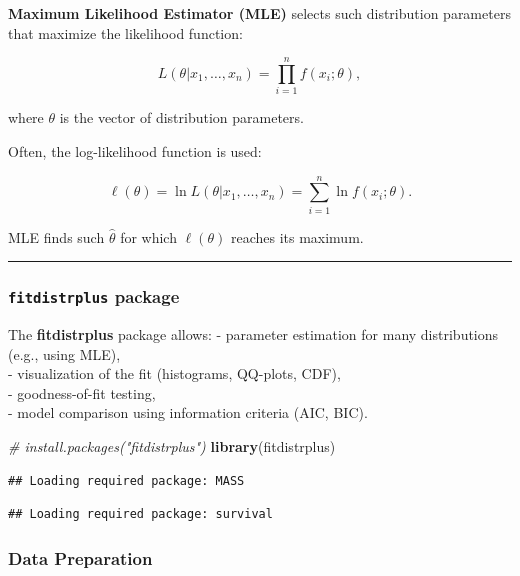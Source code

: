 \documentclass[
]{article}
\newenvironment{Shaded}{\begin{snugshade}}{\end{snugshade}}
\newcommand{\CommentTok}[1]{\textcolor[rgb]{0.56,0.35,0.01}{\textit{#1}}}
\newcommand{\FunctionTok}[1]{\textcolor[rgb]{0.13,0.29,0.53}{\textbf{#1}}}
\newcommand{\NormalTok}[1]{#1}
\begin{document}
\textbf{Maximum Likelihood Estimator (MLE)} selects such distribution
parameters that maximize the likelihood function:

\[
L(\theta | x_1, \dots, x_n) = \prod_{i=1}^n f(x_i; \theta),
\]

where \(\theta\) is the vector of distribution parameters.

Often, the log-likelihood function is used:

\[
\ell(\theta) = \ln L(\theta | x_1, \dots, x_n) = \sum_{i=1}^n \ln f(x_i; \theta).
\]

MLE finds such \(\hat{\theta}\) for which \(\ell(\theta)\) reaches its
maximum.

\begin{center}\rule{0.5\linewidth}{0.5pt}\end{center}

\subsubsection{\texorpdfstring{\texttt{fitdistrplus}
package}{fitdistrplus package}}\label{fitdistrplus-package}

The \textbf{fitdistrplus} package allows: - parameter estimation for
many distributions (e.g., using MLE),\\
- visualization of the fit (histograms, QQ-plots, CDF),\\
- goodness-of-fit testing,\\
- model comparison using information criteria (AIC, BIC).

\begin{Shaded}
\begin{Highlighting}[]
\CommentTok{\# install.packages("fitdistrplus")}
\FunctionTok{library}\NormalTok{(fitdistrplus)}
\end{Highlighting}
\end{Shaded}

\begin{verbatim}
## Loading required package: MASS
\end{verbatim}

\begin{verbatim}
## Loading required package: survival
\end{verbatim}

\subsubsection{Data Preparation}\label{data-preparation}
\end{document}
